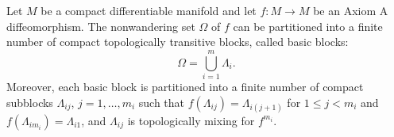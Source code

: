 \documentclass[12pt]{article}
\begin{document}
Let $M$ be a compact differentiable manifold and let $f\colon M\to M$ be an Axiom A diffeomorphism. The nonwandering set $\Omega$ of $f$ can be partitioned into a finite number of compact topologically transitive blocks, called basic blocks:
$$\Omega=\bigcup_{i=1}^m \Lambda_i.$$
Moreover, each basic block is partitioned into a finite number of compact subblocks $\Lambda_{ij}$, $j=1,\dots, m_i$ such that $f(\Lambda_{ij})=\Lambda_{i(j+1)}$ for $1\leq j<m_i$ and $f(\Lambda_{im_i})=\Lambda_{i1}$, and $\Lambda_{ij}$ is topologically mixing for $f^{m_i}$.
\end{document}
